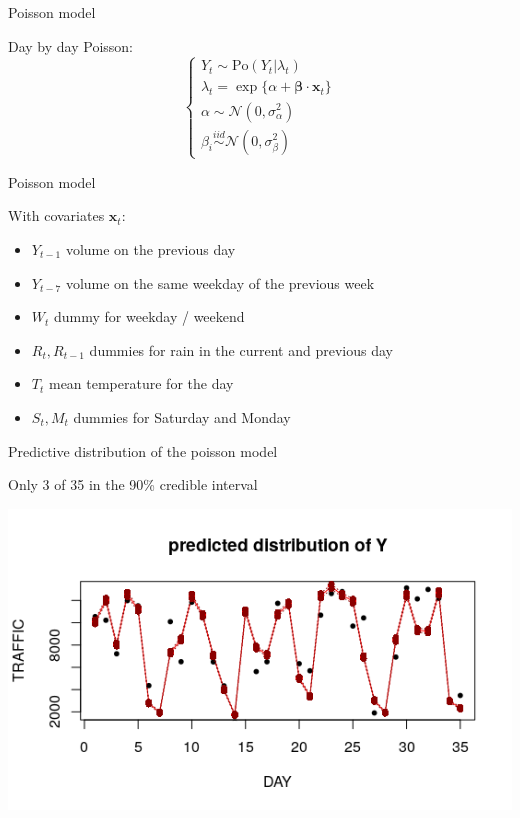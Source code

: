 \documentclass{beamer}
\begin{document}
\begin{frame}{Poisson model}

Day by day \alert{Poisson}:
\begin{equation}
\begin{cases}
Y_t \sim \mathrm{Po}(Y_t|\lambda_t) \\
\lambda_t = \exp\{\alpha + \boldsymbol{\beta}\cdot \mathbf{x}_t\}\\
\alpha \sim \mathcal{N}(0,\sigma^2_\alpha)\\
\beta_i \overset{iid}{\sim}\mathcal{N}(0,\sigma^2_\beta)
\end{cases}
\end{equation}
\end{frame}

\begin{frame}{Poisson model}

With \alert{covariates} $\mathbf{x}_{t}$:

\begin{itemize}

	\item $Y_{t-1}$ volume on the previous day

	\item $Y_{t-7}$ volume on the same weekday of the previous week

	\item $W_t$ dummy for weekday / weekend

	\item $R_t, R_{t-1}$ dummies for rain in the current and previous day

	\item $T_t$ mean temperature for the day

	\item $S_t, M_t$ dummies for Saturday and Monday 

\end{itemize}

\end{frame}


\begin{frame}{Predictive distribution of the poisson model}

Only 3 of 35 in the 90\% credible interval

\includegraphics[width=0.95\linewidth]{pictures/poiss_pred.png} 

\end{frame}
	
\end{document}
